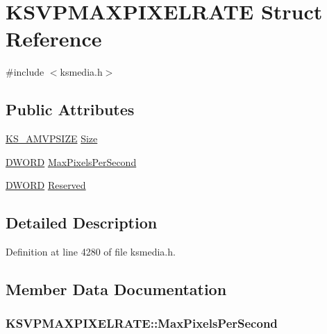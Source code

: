 \hypertarget{struct_k_s_v_p_m_a_x_p_i_x_e_l_r_a_t_e}{}\section{K\+S\+V\+P\+M\+A\+X\+P\+I\+X\+E\+L\+R\+A\+TE Struct Reference}
\label{struct_k_s_v_p_m_a_x_p_i_x_e_l_r_a_t_e}


{\ttfamily \#include $<$ksmedia.\+h$>$}

\subsection*{Public Attributes}
\begin{DoxyCompactItemize}
\item 
\hyperlink{ksmedia_8h_ab315a2aac61b0ac0dac05dcfc7c74168}{K\+S\+\_\+\+A\+M\+V\+P\+S\+I\+ZE} \hyperlink{struct_k_s_v_p_m_a_x_p_i_x_e_l_r_a_t_e_a1d6bf8a3f16b21747c028be5eebc4d15}{Size}
\item 
\hyperlink{mapinls_8h_ad342ac907eb044443153a22f964bf0af}{D\+W\+O\+RD} \hyperlink{struct_k_s_v_p_m_a_x_p_i_x_e_l_r_a_t_e_ab9a788528547e28727dc0c4ca2900d29}{Max\+Pixels\+Per\+Second}
\item 
\hyperlink{mapinls_8h_ad342ac907eb044443153a22f964bf0af}{D\+W\+O\+RD} \hyperlink{struct_k_s_v_p_m_a_x_p_i_x_e_l_r_a_t_e_a3d036175345c5f607ac8010faf00b2b6}{Reserved}
\end{DoxyCompactItemize}


\subsection{Detailed Description}


Definition at line 4280 of file ksmedia.\+h.



\subsection{Member Data Documentation}
\subsubsection[{\texorpdfstring{Max\+Pixels\+Per\+Second}{MaxPixelsPerSecond}}]{ K\+S\+V\+P\+M\+A\+X\+P\+I\+X\+E\+L\+R\+A\+T\+E\+::\+Max\+Pixels\+Per\+Second}\hypertarget{struct_k_s_v_p_m_a_x_p_i_x_e_l_r_a_t_e_ab9a788528547e28727dc0c4ca2900d29}{}\label{struct_k_s_v_p_m_a_x_p_i_x_e_l_r_a_t_e_ab9a788528547e28727dc0c4ca2900d29}


